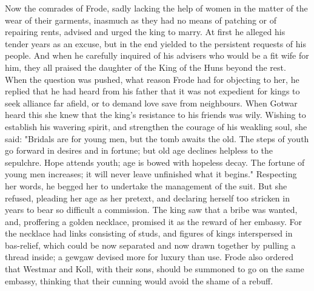 \documentclass[10pt,a4paper]{report}
\begin{document}
Now the comrades of Frode, sadly lacking the help of women in the matter of the wear of their garments, inasmuch as they had no means of patching or of repairing rents, advised and urged the king to marry. At first he alleged his tender years as an excuse, but in the end yielded to the persistent requests of his people. And when he carefully inquired of his advisers who would be a fit wife for him, they all praised the daughter of the King of the Huns beyond the rest. When the question was pushed, what reason Frode had for objecting to her, he replied that he had heard from his father that it was not expedient for kings to seek alliance far afield, or to demand love save from neighbours. When Gotwar heard this she knew that the king's resistance to his friends was wily. Wishing to establish his wavering spirit, and strengthen the courage of his weakling soul, she said: "Bridals are for young men, but the tomb awaits the old. The steps of youth go forward in desires and in fortune; but old age declines helpless to the sepulchre. Hope attends youth; age is bowed with hopeless decay. The fortune of young men increases; it will never leave unfinished what it begins." Respecting her words, he begged her to undertake the management of the suit. But she refused, pleading her age as her pretext, and declaring herself too stricken in years to bear so difficult a commission. The king saw that a bribe was wanted, and, proffering a golden necklace, promised it as the reward of her embassy. For the necklace had links consisting of studs, and figures of kings interspersed in bas-relief, which could be now separated and now drawn together by pulling a thread inside; a gewgaw devised more for luxury than use. Frode also ordered that Westmar and Koll, with their sons, should be summoned to go on the same embassy, thinking that their cunning would avoid the shame of a rebuff.\\
\end{document}
